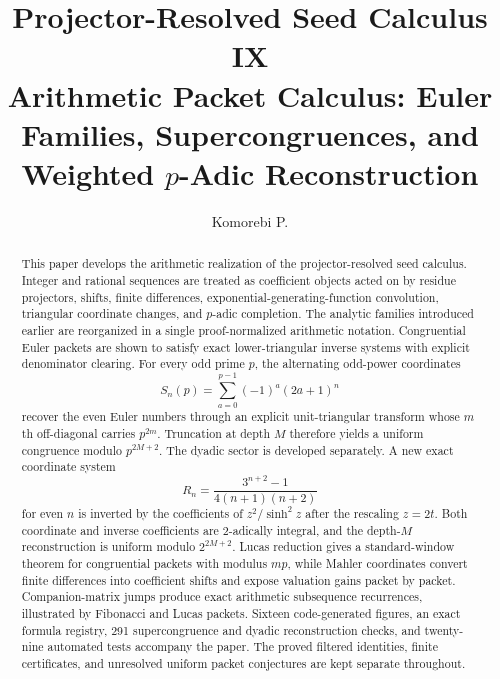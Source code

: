 \documentclass[11pt]{article}
\title{\textbf{Projector-Resolved Seed Calculus IX}\\[0.45em]
\large Arithmetic Packet Calculus: Euler Families, Supercongruences, and Weighted $p$-Adic Reconstruction}
\author{Komorebi P.}
\date{}
\theoremstyle{definition}
\theoremstyle{remark}
\begin{document}
\maketitle

\begin{abstract}
This paper develops the arithmetic realization of the projector-resolved seed calculus. Integer and rational sequences are treated as coefficient objects acted on by residue projectors, shifts, finite differences, exponential-generating-function convolution, triangular coordinate changes, and $p$-adic completion. The analytic families introduced earlier are reorganized in a single proof-normalized arithmetic notation. Congruential Euler packets are shown to satisfy exact lower-triangular inverse systems with explicit denominator clearing. For every odd prime $p$, the alternating odd-power coordinates
\[
S_n(p)=\sum_{a=0}^{p-1}(-1)^a(2a+1)^n
\]
recover the even Euler numbers through an explicit unit-triangular transform whose $m$th off-diagonal carries $p^{2m}$. Truncation at depth $M$ therefore yields a uniform congruence modulo $p^{2M+2}$. The dyadic sector is developed separately. A new exact coordinate system
\[
R_n=\frac{3^{n+2}-1}{4(n+1)(n+2)}
\]
for even $n$ is inverted by the coefficients of $z^2/\sinh^2z$ after the rescaling $z=2t$. Both coordinate and inverse coefficients are $2$-adically integral, and the depth-$M$ reconstruction is uniform modulo $2^{2M+2}$. Lucas reduction gives a standard-window theorem for congruential packets with modulus $mp$, while Mahler coordinates convert finite differences into coefficient shifts and expose valuation gains packet by packet. Companion-matrix jumps produce exact arithmetic subsequence recurrences, illustrated by Fibonacci and Lucas packets. Sixteen code-generated figures, an exact formula registry, 291 supercongruence and dyadic reconstruction checks, and twenty-nine automated tests accompany the paper. The proved filtered identities, finite certificates, and unresolved uniform packet conjectures are kept separate throughout.
\end{abstract}

\begin{center}
\end{center}
\end{document}

